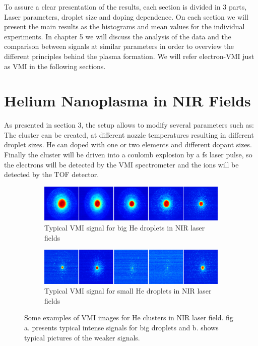 To assure a clear presentation of the results, each section is divided in 3 parts, Laser parameters, droplet size and doping dependence. On each section we will present the main results as the histograms and mean values for the individual experiments. In chapter 5 we will discuss the analysis of the data and the comparison between signals at similar parameters in order to overview the different principles behind the plasma formation. We will refer electron-VMI just as VMI in the following sections.


\section{Helium Nanoplasma in NIR Fields}

As presented in section 3, the setup allows to modify several parameters such as: The cluster can be created, at different nozzle temperatures resulting in different droplet sizes. He can doped with one or two elements and different dopant sizes. Finally the cluster will be driven into a coulomb explosion by a fs laser pulse, so the electrons will be detected by the VMI spectrometer and the ions will be detected by the TOF detector. 

\begin{figure}[h!]
\centering
\begin{subfigure}[l]{0.7\textwidth}
\caption{Typical VMI signal for big He droplets in NIR laser fields}
\includegraphics[width=1\textwidth]{../Images/results/NI_He_Dropletsize/RAW_NIR_HE_dropletsizeBigg.png}   				\end{subfigure}
\begin{subfigure}[l]{0.7\textwidth}
\caption{Typical VMI signal for small He droplets in NIR laser fields}
\includegraphics[width=1\textwidth]{../Images/results/NI_He_Dropletsize/RAW_NIR_HE_dropletsizeSmall.png} 
\end{subfigure}
\caption[examples NIR signal]{Some examples of VMI images for He clusters in NIR laser field. fig a. presents typical intense signals for big droplets and b. shows typical pictures of the weaker signals.}
\label{fig:NIRsample}
\end{figure}

